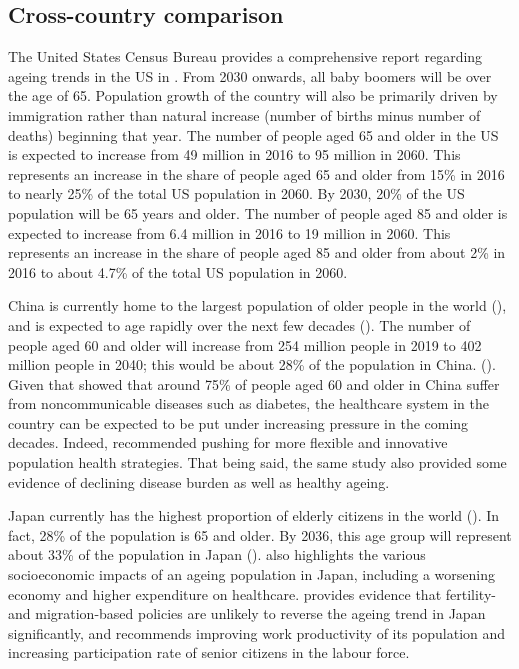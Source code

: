 \documentclass[11pt]{article}
\begin{document}
\subsection*{Cross-country comparison}
\label{subsec:crosscountrycomparison}

The United States Census Bureau provides a comprehensive report regarding ageing trends in the US in \cite{vespa2018demographic}. From 2030 onwards, all baby boomers will be over the age of 65. Population growth of the country will also be primarily driven by immigration rather than natural increase (number of births minus number of deaths) beginning that year. The number of people aged 65 and older in the US is expected to increase from 49 million in 2016 to 95 million in 2060. This represents an increase in the share of people aged 65 and older from 15\% in 2016 to nearly 25\% of the total US population in 2060. By 2030, 20\% of the US population will be 65 years and older. The number of people aged 85 and older is expected to increase from 6.4 million in 2016 to 19 million in 2060. This represents an increase in the share of people aged 85 and older from about 2\% in 2016 to about 4.7\% of the total US population in 2060.

China is currently home to the largest population of older people in the world (\cite{lancet2022population}), and is expected to age rapidly over the next few decades (\cite{BeardsonTimothy2021Ag:C}). The number of people aged 60 and older will increase from 254 million people in 2019 to 402 million people in 2040; this would be about 28\% of the population in China. (\cite{whochina}). Given that \cite{whochina} showed that around 75\% of people aged 60 and older in China suffer from noncommunicable diseases such as diabetes, the healthcare system in the country can be expected to be put under increasing pressure in the coming decades. Indeed,  \cite{LuoYanan2021TaCf} recommended pushing for more flexible and innovative population health strategies. That being said, the same study also provided some evidence of declining disease burden as well as healthy ageing.

Japan currently has the highest proportion of elderly citizens in the world (\cite{kyodo_2019}). In fact, 28\% of the population is 65 and older. By 2036, this age group will represent about 33\% of the population in Japan (\cite{d2020japan}). \cite{d2020japan} also highlights the various socioeconomic impacts of an ageing population in Japan, including a worsening economy and higher expenditure on healthcare. \cite{ParsonsAlexanderJ.Q.2018Aeof} provides evidence that fertility- and migration-based policies are unlikely to reverse the ageing trend in Japan significantly, and recommends improving work productivity of its population and increasing participation rate of senior citizens in the labour force.
\end{document}
